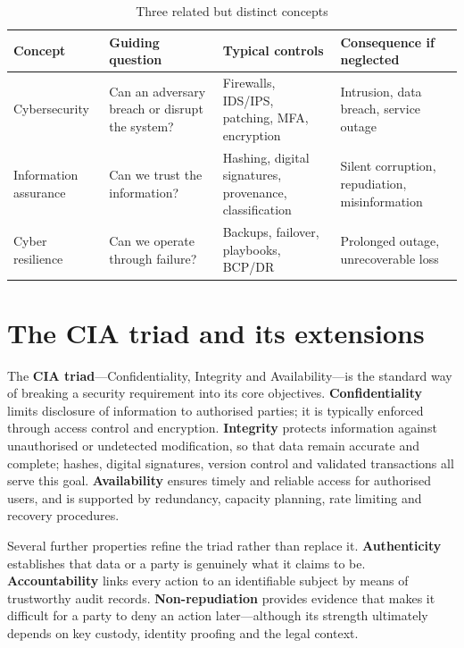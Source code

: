 \documentclass[11pt,openany]{book}
\begin{document}
\begin{table}[htbp]
  \centering\small
  \caption{Three related but distinct concepts}
  \begin{tabularx}{\linewidth}{>{\raggedright\arraybackslash}X >{\raggedright\arraybackslash}X >{\raggedright\arraybackslash}X >{\raggedright\arraybackslash}X}
    \toprule
    \textbf{Concept} & \textbf{Guiding question} & \textbf{Typical controls} & \textbf{Consequence if neglected} \\
    \midrule
    Cybersecurity & Can an adversary breach or disrupt the system? & Firewalls, IDS/IPS, patching, MFA, encryption & Intrusion, data breach, service outage \\
    Information assurance & Can we trust the information? & Hashing, digital signatures, provenance, classification & Silent corruption, repudiation, misinformation \\
    Cyber resilience & Can we operate through failure? & Backups, failover, playbooks, BCP/DR & Prolonged outage, unrecoverable loss \\
    \bottomrule
  \end{tabularx}
\end{table}
\section{The CIA triad and its extensions}\label{sec:1.2}
The \textbf{CIA triad}—Confidentiality, Integrity and Availability—is the standard way of breaking a security requirement into its core objectives. \textbf{Confidentiality} limits disclosure of information to authorised parties; it is typically enforced through access control and encryption. \textbf{Integrity} protects information against unauthorised or undetected modification, so that data remain accurate and complete; hashes, digital signatures, version control and validated transactions all serve this goal. \textbf{Availability} ensures timely and reliable access for authorised users, and is supported by redundancy, capacity planning, rate limiting and recovery procedures.

Several further properties refine the triad rather than replace it. \textbf{Authenticity} establishes that data or a party is genuinely what it claims to be. \textbf{Accountability} links every action to an identifiable subject by means of trustworthy audit records. \textbf{Non-repudiation} provides evidence that makes it difficult for a party to deny an action later—although its strength ultimately depends on key custody, identity proofing and the legal context.
\end{document}

